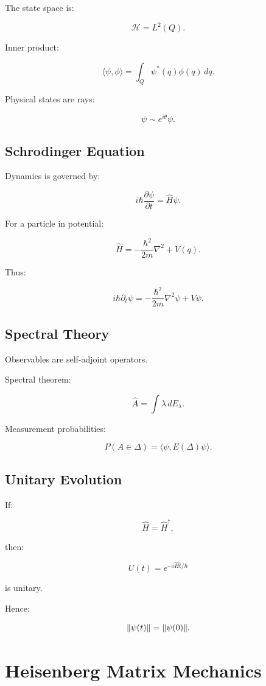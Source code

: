 \documentclass[11pt]{book}
\begin{document}
The state space is:

\[
\mathcal H = L^2(Q).
\]

Inner product:

\[
\langle \psi,\phi\rangle
=
\int_Q \psi^*(q)\phi(q)\,dq.
\]

Physical states are rays:

\[
\psi \sim e^{i\theta}\psi.
\]

\section{Schrodinger Equation}

Dynamics is governed by:

\[
i\hbar \frac{\partial \psi}{\partial t}
=
\hat H \psi.
\]

For a particle in potential:

\[
\hat H
=
-\frac{\hbar^2}{2m}\nabla^2+V(q).
\]

Thus:

\[
i\hbar \partial_t \psi
=
-\frac{\hbar^2}{2m}\nabla^2\psi
+V\psi.
\]

\section{Spectral Theory}

Observables are self-adjoint operators.

Spectral theorem:

\[
\hat A
=
\int \lambda \, dE_\lambda.
\]

Measurement probabilities:

\[
P(A\in\Delta)
=
\langle \psi,E(\Delta)\psi\rangle.
\]

\section{Unitary Evolution}

If:

\[
\hat H = \hat H^\dagger,
\]

then:

\[
U(t)=e^{-i\hat H t/\hbar}
\]

is unitary.

Hence:

\[
\norm{\psi(t)}=\norm{\psi(0)}.
\]

\chapter{Heisenberg Matrix Mechanics}
\end{document}
